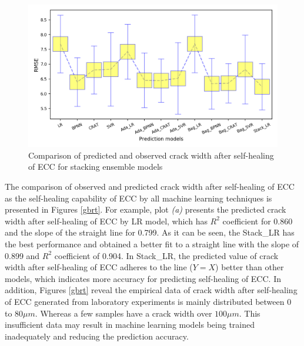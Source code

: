 \documentclass[11pt]{article}
\begin{document}
	

	
	
	\begin{figure}[!h]
		\centering
		\includegraphics[width=\textwidth]{rmseBar.png}
		\caption{Comparison of predicted and observed crack width after self-healing of ECC for  stacking ensemble models}
		\label{bar}
	\end{figure}
	
	
	
The comparison of observed and predicted crack width after self-healing of ECC as the self-healing capability of ECC by all machine learning techniques is presented in Figures \ref{gbrt}. For example, plot \textit{(a)} presents the predicted crack width after self-healing of ECC by LR model, which has $R^2$ coefficient for 0.860 and the slope of the straight line for 0.799. As it can be seen, the Stack\_LR has the best performance and obtained a better fit to a straight line with the slope of 0.899 and $R^2$ coefficient of 0.904. In Stack\_LR, the predicted value of crack width after self-healing of ECC adheres to the line ($Y=X$) better than other models, which indicates more accuracy for predicting self-healing of ECC. In addition, Figures \ref{gbrt} reveal the empirical data of crack width after self-healing of ECC generated from laboratory experiments is mainly distributed between $0$ to $80 \mu m$. Whereas a few samples have a crack width over $100 \mu m$.  This insufficient data may result in machine learning models being trained inadequately and reducing the prediction accuracy.  
\end{document}
